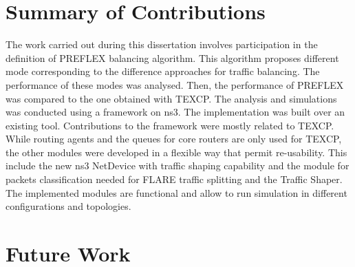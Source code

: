 \section{Summary of Contributions}
The work carried out during this dissertation involves participation in the definition of PREFLEX balancing algorithm. This algorithm proposes different  mode corresponding to the difference approaches for traffic balancing. The performance of these modes was analysed. Then, the performance of PREFLEX was compared to the one obtained with TEXCP. 
The analysis and simulations was conducted using a framework on ns3. The implementation was built over an existing tool. Contributions to the framework were mostly related to TEXCP. While routing agents and the queues for  core routers are only used for TEXCP, the other modules were developed in a flexible way that permit re-usability. This include the new ns3 NetDevice with traffic shaping capability and the module for packets classification needed for FLARE traffic splitting and the Traffic Shaper.  The implemented modules are functional and allow to run simulation in different configurations and topologies. 
\section{Future Work}
